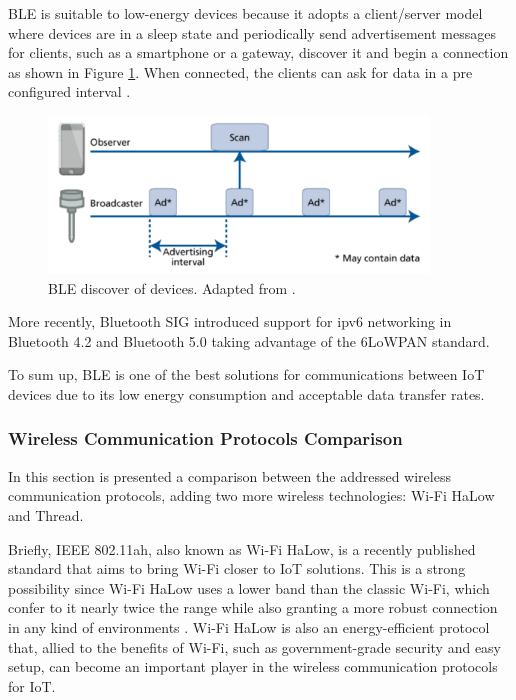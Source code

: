 BLE is suitable to low-energy devices because it adopts a client/server model where devices are in a sleep state and periodically send advertisement messages for clients, such as a smartphone or a gateway, discover it and begin a connection as shown in Figure \ref{fig:ble2}. When connected, the clients can ask for data in a pre configured interval \cite{Andersson2014}. 

\begin{figure}[H]
	\centering
	\includegraphics[width=0.9\textwidth]{figures/ble2.png}
	\caption{BLE discover of devices. Adapted from \cite{Andersson2014}.}
	\label{fig:ble2}
\end{figure}

More recently, Bluetooth SIG introduced support for \ac{ipv6} networking in Bluetooth 4.2 and Bluetooth 5.0 taking advantage of the 6LoWPAN standard.

To sum up, BLE is one of the best solutions for communications between IoT devices due to its low energy consumption and acceptable data transfer rates.


\subsubsection{Wireless Communication Protocols Comparison}

In this section is presented a comparison between the addressed wireless communication protocols, adding two more wireless technologies: Wi-Fi HaLow \cite{Wi-FiAlliance2017} and Thread.

Briefly, IEEE 802.11ah, also known as Wi-Fi HaLow, is a recently published standard that aims to bring Wi-Fi closer to IoT solutions. This is a strong possibility since Wi-Fi HaLow uses a lower band than the classic Wi-Fi, which confer to it nearly twice the range while also granting a more robust connection in any kind of environments \cite{Wi-FiAlliance2017}. Wi-Fi HaLow is also an energy-efficient protocol that, allied to the benefits of Wi-Fi, such as government-grade security and easy setup, can become an important player in the wireless communication protocols for IoT.

